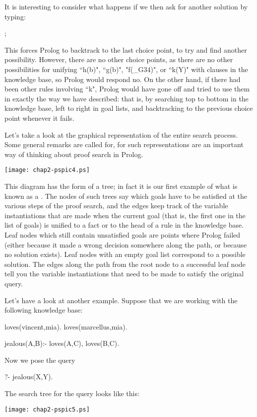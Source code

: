 It is interesting to consider what happens if we then ask for another
solution by typing:
\begin{LPNcodedisplay}
;
\end{LPNcodedisplay}
This forces Prolog to backtrack to the last choice point, to try and
find another possibility. However, there are no other choice points, as
there are no other possibilities for unifying ``h(b)", ``g(b)",
"f(\_G34)", or ``k(Y)" with clauses in the knowledge base, so Prolog
would respond no.  On the other hand, if there had been other rules
involving ``k", Prolog would have gone off and tried to use them in
exactly the way we have described: that is, by searching top to bottom
in the knowledge base, left to right in goal lists, and backtracking
to the previous choice point whenever it fails.


Let's take a look at the graphical representation of the entire search
process. Some general remarks are called for, for such representations
are an important way of thinking about proof search in Prolog.
%
\begin{center}
\texttt{[image: chap2-pspic4.ps]}
\end{center}
This diagram has the form of a tree; in fact it is our first example
of what is known as a .  The nodes of such trees
say which goals have to be satisfied at the various steps of the proof
search, and the edges keep track of the variable instantiations that
are made when the current goal (that is, the first one in the list of
goals) is unified to a fact or to the head of a rule in the knowledge
base.  Leaf nodes which still contain unsatisfied goals are points
where Prolog failed (either because it made a wrong decision somewhere
along the path, or because no solution exists). Leaf nodes with an
empty goal list correspond to a possible solution.  The edges along
the path from the root node to a successful leaf node tell you the
variable instantiations that need to be made to satisfy the original
query.

Let's have a look at another example. Suppose that we are working with
the following knowledge base:
\begin{LPNcodedisplay}
loves(vincent,mia).
loves(marcellus,mia).

jealous(A,B):- loves(A,C), loves(B,C).
\end{LPNcodedisplay}
%
Now we pose the query
\begin{LPNcodedisplay}
?- jealous(X,Y).
\end{LPNcodedisplay}
%
The search tree for the query looks like this:
%
\begin{center}
\texttt{[image: chap2-pspic5.ps]}
\end{center}

